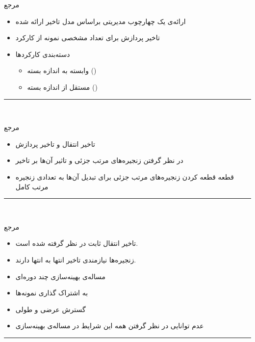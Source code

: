 \documentclass[dvipsnames]{beamer}
\makeatletter
\newcommand{\RTList}{\raggedleft\rightskip\@totalleftmargin}
\makeatother
\begin{document}
\begin{persian}
	\begin{frame}{مرجع~\cite{Li2017}}
		\begin{itemize}\RTList{}
				\justifying%
				\item ارائه‌ی یک چهارچوب مدیریتی براساس مدل تاخیر ارائه شده
				\item تاخیر پردازش برای تعداد مشخصی نمونه از کارکرد
				\item دسته‌بندی کارکردها
				\begin{itemize}\RTList{}
						\item وابسته به اندازه بسته ()
						\item مستقل از اندازه بسته ()
				\end{itemize}
		\end{itemize}
		\begin{latin}
		\noindent\rule{1cm}{0.4pt}\\
		\scriptsize{}
		\end{latin}
	\end{frame}

	\begin{frame}{مرجع~\cite{Yang2019}}
		\begin{itemize}\RTList{}
				\justifying%
				\item تاخیر انتقال و تاخیر پردازش
				\item در نظر گرفتن زنجیره‌های مرتب جزئی و تاثیر آن‌ها بر تاخیر
				\item قطعه قطعه کردن زنجیره‌های مرتب جزئی برای تبدیل آن‌ها به تعدادی زنجیره مرتب کامل
		\end{itemize}
		\begin{latin}
		\noindent\rule{1cm}{0.4pt}\\
		\scriptsize{}
		\end{latin}
	\end{frame}

	\begin{frame}{مرجع~\cite{Huang2019}}
		\begin{itemize}\RTList{}
				\justifying%
				\item تاخیر انتقال ثابت در نظر گرفته شده است.
				\item زنجیره‌ها نیازمندی تاخیر انتها به انتها دارند.
		  		\item مساله‌ی بهینه‌سازی چند دوره‌ای
				\item به اشتراک گذاری نمونه‌ها
				\item گسترش عرضی و طولی
				\item عدم توانایی در نظر گرفتن همه این شرایط در مساله‌ی بهینه‌سازی
		\end{itemize}
		\begin{latin}
		\noindent\rule{1cm}{0.4pt}\\
		\scriptsize{}
		\end{latin}
	\end{frame}


\end{persian}
\end{document}
